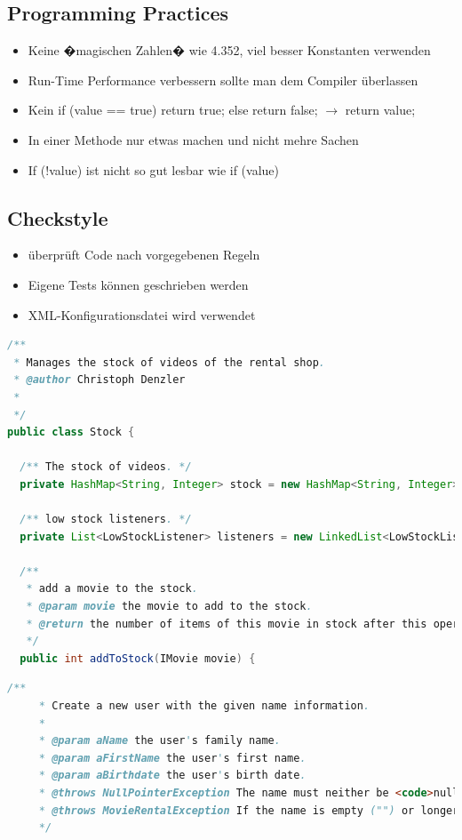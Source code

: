 \documentclass[a4paper,10pt]{article}
\begin{document}
\subsection{Programming Practices}
\begin{itemize}
\item Keine �magischen Zahlen� wie 4.352, viel besser Konstanten verwenden
\item Run-Time Performance verbessern sollte man dem Compiler \"{u}berlassen
\item Kein if (value == true) { return true; } else { return false; } $\to$ return value;
\item In einer Methode nur etwas machen und nicht mehre Sachen
\item If (!value) ist nicht so gut lesbar wie if (value)
\end{itemize}

\subsection{Checkstyle}
\begin{itemize}
\item \"{u}berpr\"{u}ft Code nach vorgegebenen Regeln
\item Eigene Tests k\"{o}nnen geschrieben werden
\item XML-Konfigurationsdatei wird verwendet
\end{itemize}

\begin{lstlisting}[language=Java,caption=JavaDoc Beispiel 1, style=MyJavaStyle]
/**
 * Manages the stock of videos of the rental shop.
 * @author Christoph Denzler
 *
 */
public class Stock {
  
  /** The stock of videos. */
  private HashMap<String, Integer> stock = new HashMap<String, Integer>();
  
  /** low stock listeners. */
  private List<LowStockListener> listeners = new LinkedList<LowStockListener>();
  
  /**
   * add a movie to the stock.
   * @param movie the movie to add to the stock.
   * @return the number of items of this movie in stock after this operation.
   */
  public int addToStock(IMovie movie) {
\end{lstlisting}

\begin{lstlisting}[language=Java,caption=JavaDoc Beispiel 2, style=MyJavaStyle]
    /**
     * Create a new user with the given name information.
     * 
     * @param aName the user's family name.
     * @param aFirstName the user's first name.
     * @param aBirthdate the user's birth date.
     * @throws NullPointerException The name must neither be <code>null</code>.
     * @throws MovieRentalException If the name is empty ("") or longer than 40 characters.
     */
\end{lstlisting}
\end{document}
